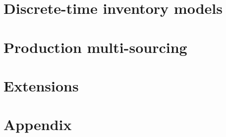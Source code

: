 
\cleardoublepage
\part{Discrete-time inventory models}
\label{part:production planning}





\cleardoublepage
\part{Production multi-sourcing}
\label{part:multi-sourcing}





\cleardoublepage
\part{Extensions}
\label{part:extensions}


 


\appendix


\cleardoublepage
\part*{Appendix}
\label{part:appendix}







\cleardoublepage
{}





